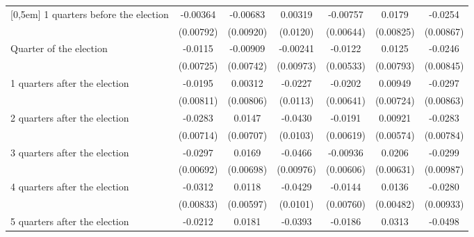 \begin{table}[!ht]
\begin{tabular}{l*{6}{c}}
[0,5em]
 1 quarters before the election&    -0.00364         &    -0.00683         &     0.00319         &    -0.00757         &      0.0179\sym{*}  &     -0.0254\sym{**} \\
                    &   (0.00792)         &   (0.00920)         &    (0.0120)         &   (0.00644)         &   (0.00825)         &   (0.00867)         \\
[0,5em]
Quarter of the election&     -0.0115         &    -0.00909         &    -0.00241         &     -0.0122\sym{*}  &      0.0125         &     -0.0246\sym{**} \\
                    &   (0.00725)         &   (0.00742)         &   (0.00973)         &   (0.00533)         &   (0.00793)         &   (0.00845)         \\
[0,5em]
 1 quarters after the election&     -0.0195\sym{*}  &     0.00312         &     -0.0227\sym{*}  &     -0.0202\sym{**} &     0.00949         &     -0.0297\sym{***}\\
                    &   (0.00811)         &   (0.00806)         &    (0.0113)         &   (0.00641)         &   (0.00724)         &   (0.00863)         \\
[0,5em]
 2 quarters after the election&     -0.0283\sym{***}&      0.0147\sym{*}  &     -0.0430\sym{***}&     -0.0191\sym{**} &     0.00921         &     -0.0283\sym{***}\\
                    &   (0.00714)         &   (0.00707)         &    (0.0103)         &   (0.00619)         &   (0.00574)         &   (0.00784)         \\
[0,5em]
 3 quarters after the election&     -0.0297\sym{***}&      0.0169\sym{*}  &     -0.0466\sym{***}&    -0.00936         &      0.0206\sym{**} &     -0.0299\sym{**} \\
                    &   (0.00692)         &   (0.00698)         &   (0.00976)         &   (0.00606)         &   (0.00631)         &   (0.00987)         \\
[0,5em]
 4 quarters after the election&     -0.0312\sym{***}&      0.0118\sym{*}  &     -0.0429\sym{***}&     -0.0144         &      0.0136\sym{**} &     -0.0280\sym{**} \\
                    &   (0.00833)         &   (0.00597)         &    (0.0101)         &   (0.00760)         &   (0.00482)         &   (0.00933)         \\
[0,5em]
 5 quarters after the election&     -0.0212\sym{**} &      0.0181         &     -0.0393\sym{**} &     -0.0186\sym{**} &      0.0313\sym{***}&     -0.0498\sym{***}\\

\end{tabular}
\end{table}
